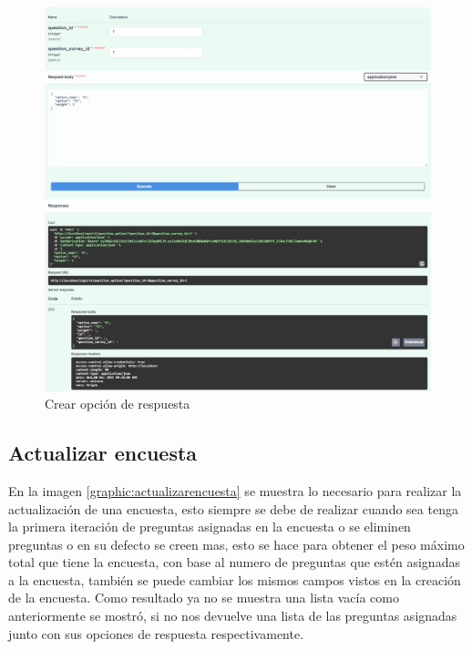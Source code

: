 \begin{figure}[!htb]
    \centering
    \includegraphics[scale=.3]{TT/img/pruebas/test_crear_opcion_de_respuesta.png}
    \caption{Crear opción de respuesta}
    \label{graphic:crearopcionderespuesta}
\end{figure}

\subsection{Actualizar encuesta}
En la imagen \ref{graphic:actualizarencuesta} se muestra lo necesario para realizar la actualización de una encuesta, esto siempre se debe de realizar cuando sea tenga la primera iteración de preguntas asignadas en la encuesta o se  eliminen preguntas o en su defecto se creen mas, esto se hace para obtener el peso máximo total que tiene la encuesta, con base al numero de preguntas que estén asignadas a la encuesta, también se puede cambiar los mismos campos vistos en la creación de la encuesta. Como resultado ya no se muestra una lista vacía como anteriormente se mostró, si no nos devuelve una lista de las preguntas asignadas junto con sus opciones de respuesta respectivamente.

